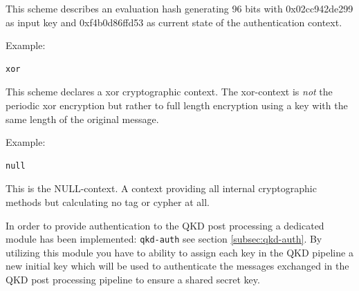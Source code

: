 This scheme describes an evaluation hash generating 96 bits with 0x02cc942de299 as input key and 0xf4b0d86ffd53 as current state of the authentication context.

\medskip

\noindent Example:

\begin{minipage}{0.9\textwidth}
\bigskip
\begin{verbatim}
xor
\end{verbatim}
\medskip
\end{minipage}

This scheme declares a xor cryptographic context. The xor-context is \emph{not} the periodic xor encryption but rather to full length encryption using a key with the same length of the original message.

\medskip

\clearpage

\noindent Example:

\begin{minipage}{0.9\textwidth}
\bigskip
\begin{verbatim}
null
\end{verbatim}
\medskip
\end{minipage}

This is the NULL-context. A context providing all internal cryptographic methods but calculating no tag or cypher at all.

\medskip

In order to provide authentication to the QKD post processing a dedicated module has been implemented: \texttt{qkd-auth} see section \ref{subsec:qkd-auth}. By utilizing this module you have to ability to assign each key in the QKD pipeline a new initial key which will be used to authenticate the messages exchanged in the QKD post processing pipeline to ensure a shared secret key.

\medskip

